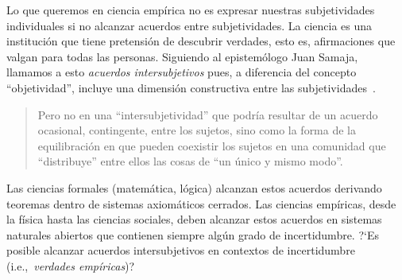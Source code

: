 \documentclass[a4paper,11pt]{book}
\theoremstyle{definition}
\begin{document}

Lo que queremos en ciencia emp\'irica no es expresar nuestras subjetividades individuales si no alcanzar acuerdos entre subjetividades.
%
La ciencia es una instituci\'on que tiene pretensi\'on de descubrir verdades, esto es, afirmaciones que valgan para todas las personas.
%
Siguiendo al epistem\'ologo Juan Samaja, llamamos a esto \emph{acuerdos intersubjetivos} pues, a diferencia del concepto ``objetividad'', incluye una dimensi\'on constructiva entre las subjetividades~\cite{Samaja1999}.
%
\begin{quotation}
Pero no en una ``intersubjetividad'' que podr\'ia resultar de un acuerdo ocasional, contingente, entre los sujetos, sino como la forma de la equilibraci\'on en que pueden coexistir los sujetos en una comunidad que ``distribuye'' entre ellos las cosas de ``un \'unico y mismo modo''.
\end{quotation}
%
Las ciencias formales (matem\'atica, l\'ogica) alcanzan estos acuerdos derivando teoremas dentro de sistemas axiom\'aticos cerrados.
%
Las ciencias emp\'iricas, desde la f\'isica hasta las ciencias sociales, deben alcanzar estos acuerdos en sistemas naturales abiertos que contienen siempre alg\'un grado de incertidumbre.
%
?`Es posible alcanzar acuerdos intersubjetivos en contextos de incertidumbre (i.e.,~\emph{verdades emp\'iricas})?

\end{document}
